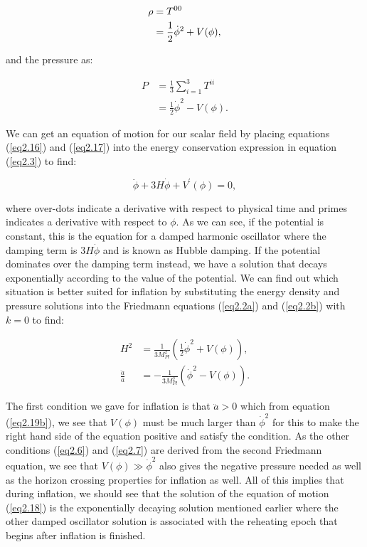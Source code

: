\documentclass[a4paper,12pt,twoside]{report}
\begin{document}
\begin{equation} \label{eq2.16}
\begin{aligned}
\rho &= \tensor{T}{^{00}} \\
&= \frac{1}{2} \dot{\phi}^{2} + V(\phi),
\end{aligned}
\end{equation}

and the pressure as:

\begin{equation} \label{eq2.17}
\begin{aligned}
P &= \frac{1}{3} \sum\limits_{i=1}^{3} T^{ii} \\
&= \frac{1}{2} \dot{\phi}^{2} - V(\phi).
\end{aligned}
\end{equation}

We can get an equation of motion for our scalar field by placing equations (\ref{eq2.16}) and (\ref{eq2.17}) into the energy conservation expression in equation (\ref{eq2.3}) to find:

\begin{equation} \label{eq2.18}
\ddot{\phi} + 3H\dot{\phi} +V^{\prime}(\phi) = 0,
\end{equation}

where over-dots indicate a derivative with respect to physical time and primes indicates a derivative with respect to $\phi$. As we can see, if the potential is constant, this is the equation for a damped harmonic oscillator where the damping term is $3H\dot{\phi}$ and is known as Hubble damping. If the potential dominates over the damping term instead, we have a solution that decays exponentially according to the value of the potential. We can find out which situation is better suited for inflation by substituting the energy density and pressure solutions into the Friedmann equations (\ref{eq2.2a}) and (\ref{eq2.2b}) with $k = 0$ to find:

\begin{subequations}
\begin{align}
H^{2} &= \frac{1}{3M_{Pl}^{2}}\left( \frac{1}{2} \dot{\phi}^{2} + V(\phi) \right), \label{eq2.19a} \\
\frac{\ddot{a}}{a} &= - \frac{1}{3M_{Pl}^{2}} \left(\dot{\phi}^{2} - V(\phi)\right). \label{eq2.19b}
\end{align}
\end{subequations}

The first condition we gave for inflation is that $\ddot{a} > 0$ which from equation (\ref{eq2.19b}), we see that $V(\phi)$ must be much larger than $\dot{\phi}^{2}$ for this to make the right hand side of the equation positive and satisfy the condition. As the other conditions (\ref{eq2.6}) and (\ref{eq2.7}) are derived from the second Friedmann equation, we see that $V(\phi) \gg \dot{\phi}^{2}$ also gives the negative pressure needed as well as the horizon crossing properties for inflation as well. All of this implies that during inflation, we should see that the solution of the equation of motion (\ref{eq2.18}) is the exponentially decaying solution mentioned earlier where the other damped oscillator solution is associated with the reheating epoch that begins after inflation is finished.
\end{document}
